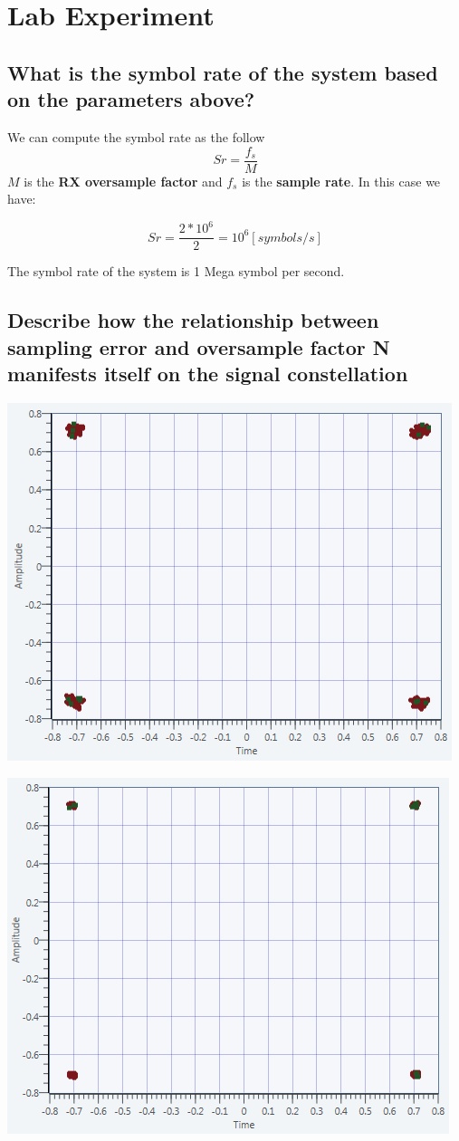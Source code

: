 \documentclass[frenchb, oneside, headings=normal]{scrartcl}
\begin{document}
\section{Lab Experiment}
\subsection{What is the symbol rate of the system based on the parameters above?}

We can compute the symbol rate as the follow
\begin{equation}
Sr =\frac{f_s}{M}
\end{equation}
$M$ is the \textbf{RX oversample factor} and $f_s$ is the \textbf{sample rate}. In this case we have:

$$Sr = \frac{2*10^{6}}{2} = 10^6[symbols/s]$$
       
The symbol rate of the system is 1 Mega symbol per second.

\subsection{Describe how the relationship between sampling error and oversample factor N manifests itself on the signal constellation}

\begin{center}
\includegraphics[width=.7\textwidth]{img/ConstellationN2-MaxEnergy}
\label{const_2}
\end{center}


\begin{center}
\includegraphics[width=.7\textwidth]{img/ConstellationN4-MaxEnergy}
\label{const_4}
\end{center}
\end{document}
